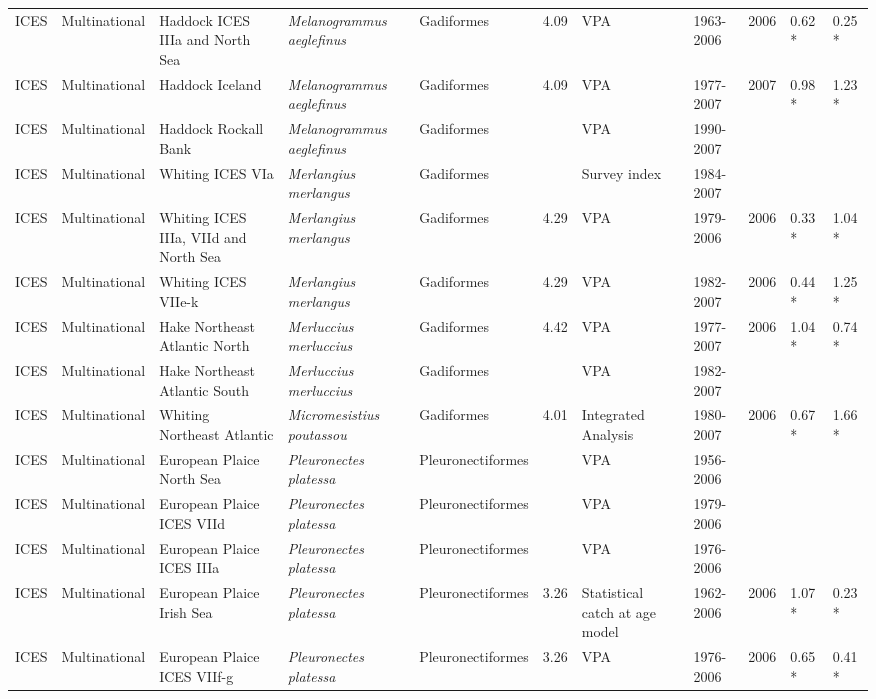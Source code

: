 \begin{longtable}{p{1.5cm}p{1.5cm}p{3cm}p{3cm}p{2.5cm}p{0.9cm}p{1.4cm}p{0.9cm}p{0.9cm}p{0.9cm}p{1cm}}
  ICES & Multinational & Haddock ICES IIIa and North Sea & \textit{Melanogrammus aeglefinus} & Gadiformes & 4.09 & VPA & 1963-2006 & 2006 & 0.62 * & 0.25 * \\ 
  ICES & Multinational & Haddock Iceland & \textit{Melanogrammus aeglefinus} & Gadiformes & 4.09 & VPA & 1977-2007 & 2007 & 0.98 * & 1.23 * \\ 
  ICES & Multinational & Haddock Rockall Bank & \textit{Melanogrammus aeglefinus} & Gadiformes &  & VPA & 1990-2007 &  &  &  \\ 
  ICES & Multinational & Whiting ICES VIa & \textit{Merlangius merlangus} & Gadiformes &  & Survey index & 1984-2007 &  &  &  \\ 
  ICES & Multinational & Whiting ICES IIIa, VIId and North Sea & \textit{Merlangius merlangus} & Gadiformes & 4.29 & VPA & 1979-2006 & 2006 & 0.33 * & 1.04 * \\ 
  ICES & Multinational & Whiting ICES VIIe-k & \textit{Merlangius merlangus} & Gadiformes & 4.29 & VPA & 1982-2007 & 2006 & 0.44 * & 1.25 * \\ 
  ICES & Multinational & Hake Northeast Atlantic North & \textit{Merluccius merluccius} & Gadiformes & 4.42 & VPA & 1977-2007 & 2006 & 1.04 * & 0.74 * \\ 
  ICES & Multinational & Hake Northeast Atlantic South & \textit{Merluccius merluccius} & Gadiformes &  & VPA & 1982-2007 &  &  &  \\ 
  ICES & Multinational & Whiting Northeast Atlantic & \textit{Micromesistius poutassou} & Gadiformes & 4.01 & Integrated Analysis & 1980-2007 & 2006 & 0.67 * & 1.66 * \\ 
  ICES & Multinational & European Plaice North Sea & \textit{Pleuronectes platessa} & Pleuronectiformes &  & VPA & 1956-2006 &  &  &  \\ 
  ICES & Multinational & European Plaice ICES VIId & \textit{Pleuronectes platessa} & Pleuronectiformes &  & VPA & 1979-2006 &  &  &  \\ 
  ICES & Multinational & European Plaice ICES IIIa & \textit{Pleuronectes platessa} & Pleuronectiformes &  & VPA & 1976-2006 &  &  &  \\ 
  ICES & Multinational & European Plaice Irish Sea & \textit{Pleuronectes platessa} & Pleuronectiformes & 3.26 & Statistical catch at age model & 1962-2006 & 2006 & 1.07 * & 0.23 * \\ 
  ICES & Multinational & European Plaice ICES VIIf-g & \textit{Pleuronectes platessa} & Pleuronectiformes & 3.26 & VPA & 1976-2006 & 2006 & 0.65 * & 0.41 * \\ 

\end{longtable}
